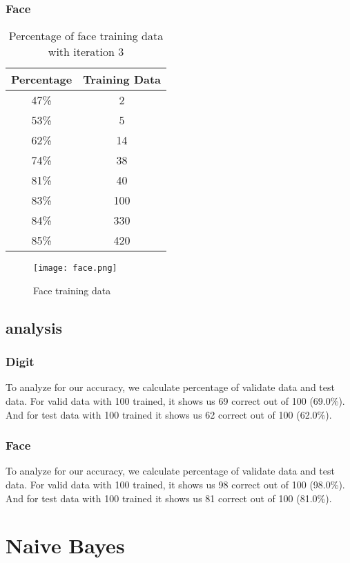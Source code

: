 \documentclass{article}
\begin{document}
        \subsubsection{Face}
            \begin{table}[h]
                \centering
                \begin{tabular}{c|c}
                    \hline
                        Percentage & Training Data \\
                    \hline
                        47\% & 2\\
                    \hline
                        53\% & 5\\
                    \hline
                        62\% & 14\\
                    \hline
                        74\% & 38\\
                    \hline
                        81\% & 40\\
                    \hline
                        83\% & 100\\
                    \hline
                        84\% & 330\\
                    \hline
                        85\% & 420\\
                    \hline
                    
                \end{tabular}
                \caption{Percentage of face training data with iteration 3}
            \end{table}
            
            \begin{figure}[h]
                \centering
                \texttt{[image: face.png]}
                \caption{Face training data}
            \end{figure}
        \newpage
    \subsection{analysis}
        \subsubsection{Digit}
            To analyze for our accuracy, we calculate percentage of validate data and test data. \newline
            For valid data with 100 trained, it shows us 69 correct out of 100 (69.0\%). And for test data with 100 trained it shows us 62 correct out of 100 (62.0\%).
        \subsubsection{Face}
            To analyze for our accuracy, we calculate percentage of validate data and test data. \newline
            For valid data with 100 trained, it shows us 98 correct out of 100 (98.0\%). And for test data with 100 trained it shows us 81 correct out of 100 (81.0\%).

\section{Naive Bayes}
\end{document}
